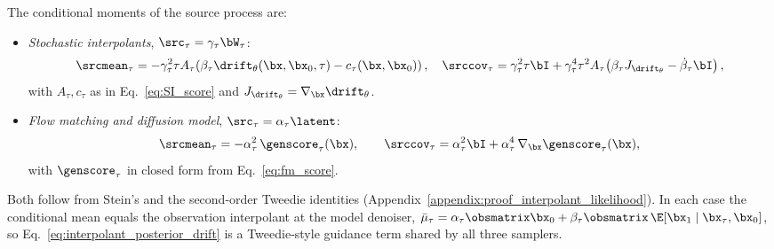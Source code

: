 \begin{lemma}\label{lem:source_moments}
    The conditional moments of the source process are:
    \begin{itemize}
        \item \emph{Stochastic interpolants}, $\src_\tau = \gamma_\tau\bW_\tau$:
        \begin{align}
            \srcmean_\tau = -\gamma_\tau^2\tau A_\tau\!\left(\beta_\tau\drift_\theta(\bx,\bx_0,\tau) - c_\tau(\bx,\bx_0)\right),
            \quad
            \srccov_\tau = \gamma_\tau^2\tau\bI + \gamma_\tau^4\tau^2 A_\tau\!\left(\beta_\tau J_{\drift_\theta} - \dot\beta_\tau\bI\right),
        \end{align}
        with $A_\tau, c_\tau$ as in Eq.~\eqref{eq:SI_score} and $J_{\drift_\theta}=\nabla_{\bx}\drift_\theta$.
        \item \emph{Flow matching and diffusion model}, $\src_\tau = \alpha_\tau\latent$:
        \begin{align}\label{eq:fm_source_moments}
            \srcmean_\tau = -\alpha_\tau^2\,\genscore_\tau(\bx),
            \qquad
            \srccov_\tau = \alpha_\tau^2\bI + \alpha_\tau^4\,\nabla_{\bx}\genscore_\tau(\bx),
        \end{align}
        with $\genscore_\tau$ in closed form from Eq.~\eqref{eq:fm_score}.
    \end{itemize}
    \end{lemma}
    Both follow from Stein's and the second-order Tweedie identities (Appendix~\ref{appendix:proof_interpolant_likelihood}). In each case the conditional mean equals the observation interpolant at the model denoiser, $\bar\mu_\tau = \alpha_\tau\obsmatrix\bx_0 + \beta_\tau\obsmatrix\,\E[\bx_1\mid\bx_\tau,\bx_0]$, so Eq.~\eqref{eq:interpolant_posterior_drift} is a Tweedie-style guidance term shared by all three samplers.
    
